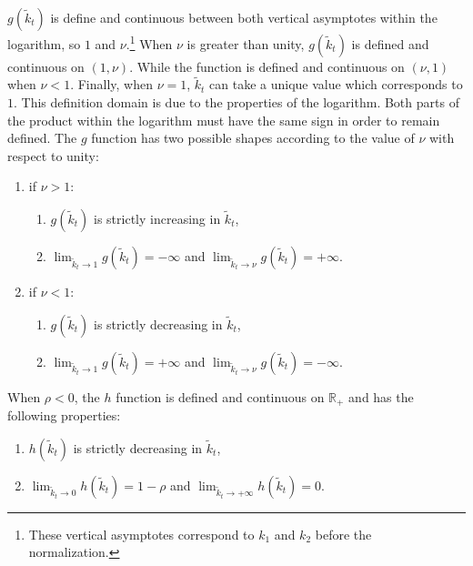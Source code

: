 $g(\tilde{k}_t)$ is define and continuous between both vertical asymptotes within the logarithm, so $1$ and $\nu$.\footnote{These vertical asymptotes correspond to $k_1$ and $k_2$ before the normalization.} When $\nu$ is greater than unity, $g(\tilde{k}_t)$ is defined and continuous on $\left(1, \nu\right)$. While the function is defined and continuous on $\left(\nu, 1\right)$ when $\nu < 1$. Finally, when $\nu = 1$, $\tilde{k}_t$ can take a unique value which corresponds to $1$. This definition domain is due to the properties of the logarithm. Both parts of the product within the logarithm must have the same sign in order to remain defined. The $g$ function has two possible shapes according to the value of $\nu$ with respect to unity:
	\begin{enumerate}
		\item if $\nu > 1$:
		\begin{enumerate}
			\item $g(\tilde{k}_t)$ is strictly increasing in $\tilde{k}_t$,%
			\item $\lim_{\tilde{k}_t\to 1} g(\tilde{k}_t) = -\infty$  and $\lim_{\tilde{k}_t\to \nu} g(\tilde{k}_t) = +\infty$.
		\end{enumerate}
		\item if $\nu < 1$:
		\begin{enumerate}
			\item $g(\tilde{k}_t)$ is strictly decreasing in $\tilde{k}_t$,%
			\item $\lim_{\tilde{k}_t\to 1} g(\tilde{k}_t) = +\infty$ and $\lim_{\tilde{k}_t\to \nu} g(\tilde{k}_t) = -\infty$.
		\end{enumerate}
	\end{enumerate}
When $\rho<0$, the $h$ function is defined and continuous on $\mathbb{R}_+$ and has the following properties:
	\begin{enumerate}
		\item $h(\tilde{k}_t)$ is strictly decreasing in $\tilde{k}_t$,%
		\item $\lim_{\tilde{k}_t\to 0} h(\tilde{k}_t) = 1-\rho$ and $\lim_{\tilde{k}_t\to +\infty} h(\tilde{k}_t) = 0$.
	\end{enumerate}


